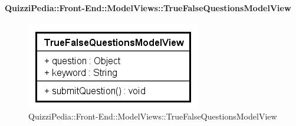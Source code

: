 \paragraph[QuizziPedia::Front-End::ModelViews\\::TrueFalseQuestionsModelView]{QuizziPedia::Front-End::ModelViews::TrueFalseQuestionsModelView}
\begin{figure} [ht]
	\centering
	\includegraphics[scale=0.80]{UML/Classi/Front-End/QuizziPedia_Front-end_ModelView_TrueFalseQuestionsModelView.png}
	\caption{QuizziPedia::Front-End::ModelViews::TrueFalseQuestionsModelView}
\end{figure} \FloatBarrier
